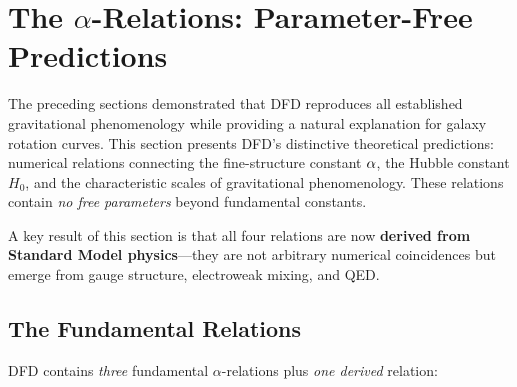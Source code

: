 
\section{The \texorpdfstring{$\alpha$}{α}-Relations: Parameter-Free Predictions}\label{sec:alpha}

The preceding sections demonstrated that DFD reproduces all established gravitational phenomenology while providing a natural explanation for galaxy rotation curves. This section presents DFD's distinctive theoretical predictions: numerical relations connecting the fine-structure constant $\alpha$, the Hubble constant $H_0$, and the characteristic scales of gravitational phenomenology. These relations contain \textit{no free parameters} beyond fundamental constants.

A key result of this section is that all four relations are now \textbf{derived from Standard Model physics}---they are not arbitrary numerical coincidences but emerge from gauge structure, electroweak mixing, and QED.

\subsection{The Fundamental Relations}\label{sec:alpha-overview}

DFD contains \textit{three} fundamental $\alpha$-relations plus \textit{one derived} relation:

